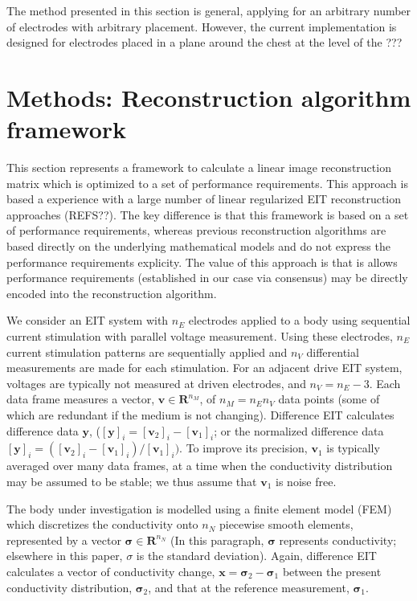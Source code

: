 \documentclass[12pt]{iopart}
\newcommand{\mathbb}{\mathbf}
\newcommand{\vB}{\mbox{$\mathbf{v}$}}
\newcommand{\xB}{\mbox{$\mathbf{x}$}}
\newcommand{\yB}{\mbox{$\mathbf{y}$}}
\newcommand{\sG}{\mbox{${\mathbf \sigma}$}}
\begin{document}
The method presented in this section is general,
applying for an arbitrary number of electrodes  with 
arbitrary placement. However, the current implementation
is designed for electrodes placed in a plane around the
chest at the level of the ???

\section{Methods: Reconstruction algorithm framework}

This section represents a framework to calculate
a linear image reconstruction matrix which is optimized
to a set of performance requirements. This approach
is based a experience with a large number of 
linear regularized EIT reconstruction approaches
(REFS??). The key difference is that this framework
is based on a set of performance requirements, whereas
previous reconstruction algorithms are based directly on
the underlying mathematical models and do not express
the performance requirements explicity.
The value of this approach is that is allows
performance requirements (established in our case
via consensus) may be directly encoded into the
reconstruction algorithm.

We consider an EIT system with $n_E$ electrodes applied to a body
using sequential current stimulation with parallel voltage
measurement. Using these electrodes, $n_E$ current stimulation
patterns are sequentially applied and $n_V$ differential
measurements are made for each stimulation.  For an adjacent drive
EIT system, voltages are typically not measured at driven
electrodes, and $n_V = n_E - 3$.  Each data frame measures
a vector, $\vB\in\mathbb{R}^{n_M}$, of $n_M= n_E n_V$ data points
(some of which are redundant if the medium is not changing).
Difference EIT calculates difference data $\yB$, ($[\yB]_i =
[\vB_2]_i - [\vB_1]_i$; or the normalized difference data $[\yB]_i
= ([\vB_2]_i - [\vB_1]_i)/[\vB_1]_i)$. To improve its precision,
$\vB_1$ is typically averaged over many data frames, at a time
when the conductivity distribution may be assumed to be stable;
 we thus assume that $\vB_1$ is noise free.

The body under investigation is modelled using a finite element
model (FEM) which discretizes the conductivity onto $n_N$
piecewise smooth elements, represented by a vector
$\sG\in\mathbb{R}^{n_N}$ (In this paragraph, $\sG$ represents
conductivity; elsewhere in this paper, $\sigma$ is the standard
deviation). Again, difference EIT calculates a vector of
conductivity change, $\xB = \sG_2 - \sG_1$ between the present
conductivity distribution, $\sG_2$, and that at the reference
measurement, $\sG_1$.
\end{document}
